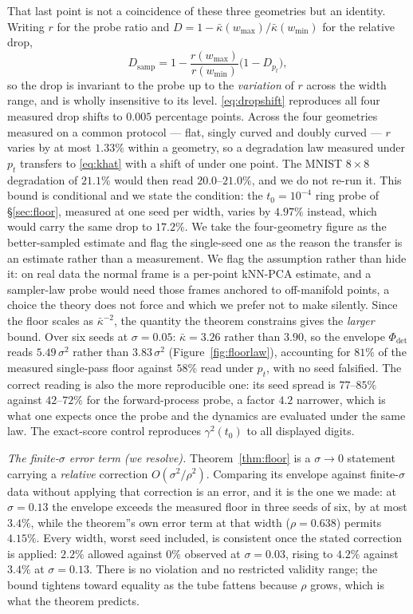 \documentclass[11pt]{article}
\theoremstyle{remark}
\newcommand{\kb}{\bar\kappa}
\newcommand{\Phidet}{\Phi_{\mathrm{det}}}
\newcommand{\sigsq}{\sigma^2}
\begin{document}
That last point is not a coincidence of these three geometries but an identity. Writing
$r$ for the probe ratio and $D=1-\kb(w_{\max})/\kb(w_{\min})$ for the relative drop,
\begin{equation}
D_{\mathrm{samp}}=1-\frac{r(w_{\max})}{r(w_{\min})}\big(1-D_{p_t}\big),
\label{eq:dropshift}
\end{equation}
so the drop is invariant to the probe up to the \emph{variation} of $r$ across the width
range, and is wholly insensitive to its level. \eqref{eq:dropshift} reproduces all four
measured drop shifts to $0.005$ percentage points. Across the four geometries measured on
a common protocol --- flat, singly curved and doubly curved --- $r$ varies by at most
$1.33\%$ within a geometry, so a degradation law measured under $p_t$ transfers to
\eqref{eq:khat} with a shift of under one point. The MNIST $8\times8$ degradation of
$21.1\%$ would then read $20.0$--$21.0\%$, and we do not re-run it. This bound is
conditional and we state the condition: the $t_0=10^{-4}$ ring probe of
\S\ref{sec:floor}, measured at one seed per width, varies by $4.97\%$ instead, which
would carry the same drop to $17.2\%$. We take the four-geometry figure as the
better-sampled estimate and flag the single-seed one as the reason the transfer is an
estimate rather than a measurement. We flag the assumption
rather than hide it: on real data the normal frame is a per-point kNN-PCA estimate, and a
sampler-law probe would need those frames anchored to off-manifold points, a choice the
theory does not force and which we prefer not to make silently.
Since the floor scales as $\kb^{-2}$, the quantity the theorem constrains gives the
\emph{larger} bound. Over six seeds at $\sigma=0.05$: $\kb=3.26$ rather than $3.90$, so
the envelope $\Phidet$ reads $5.49\,\sigsq$ rather than $3.83\,\sigsq$
(Figure~\ref{fig:floorlaw}), accounting for $81\%$ of the measured single-pass floor
against $58\%$ read under $p_t$, with no seed falsified. The correct reading is also the
more reproducible one: its seed spread is $77$--$85\%$ against $42$--$72\%$ for the
forward-process probe, a factor $4.2$ narrower, which is what one expects once the probe and the dynamics are
evaluated under the same law. The exact-score control reproduces $\gamma^2(t_0)$ to all
displayed digits.

\emph{The finite-$\sigma$ error term (\emph{we resolve}).} Theorem~\ref{thm:floor} is a
$\sigma\to0$ statement carrying a \emph{relative} correction $O(\sigsq/\rho^2)$. Comparing
its envelope against finite-$\sigma$ data without applying that correction is an error, and
it is the one we made: at $\sigma=0.13$ the envelope exceeds the measured floor in three
seeds of six, by at most $3.4\%$, while the theorem''s own error term at that width
($\rho=0.638$) permits $4.15\%$. Every width, worst seed included, is consistent once the
stated correction is applied: $2.2\%$ allowed against $0\%$ observed at $\sigma=0.03$,
rising to $4.2\%$ against $3.4\%$ at $\sigma=0.13$. There is no violation and no
restricted validity range; the bound tightens toward equality as the tube fattens because
$\rho$ grows, which is what the theorem predicts.
\end{document}

